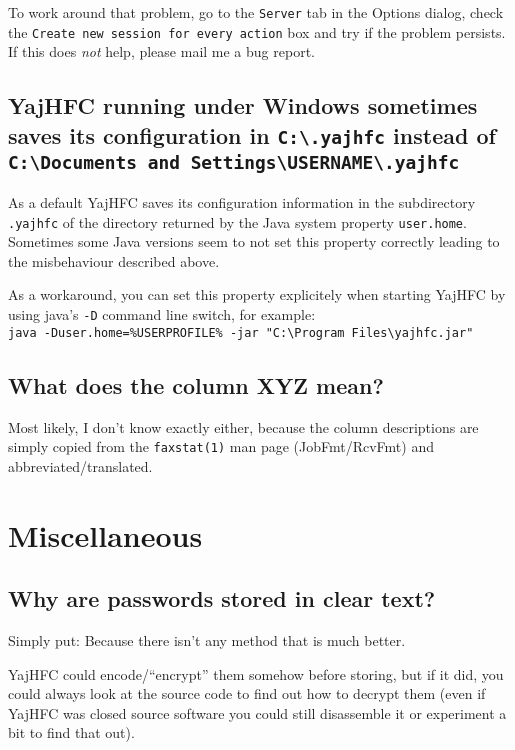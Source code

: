 \documentclass[a4paper,10pt]{scrartcl}
\begin{document}
To work around that problem, go to the \texttt{Server} tab in the Options dialog, check the \texttt{Create new session for every action} box and try if the problem persists.
If this does \emph{not} help, please mail me a bug report.

\subsection{YajHFC running under Windows sometimes saves its configuration in \texttt{C:\textbackslash .yajhfc} instead of \texttt{C:\textbackslash Documents and Settings\textbackslash USERNAME\textbackslash .yajhfc}}

As a default YajHFC saves its configuration information in the subdirectory \texttt{.yajhfc} of the directory returned by
the Java system property \texttt{user.home}.
Sometimes some Java versions seem to not set this property correctly leading to the misbehaviour described above.

As a workaround, you can set this property explicitely when starting YajHFC by using java's \texttt{-D} command line switch, for example: \\
\texttt{java -Duser.home=\%USERPROFILE\% -jar "C:\textbackslash Program Files\textbackslash yajhfc.jar"}

\subsection{What does the column XYZ mean?}

Most likely, I don't know exactly either, because the column descriptions
are simply copied from the \verb.faxstat(1). man page (JobFmt/RcvFmt) and 
abbreviated/translated.

\section{Miscellaneous}

\subsection{Why are passwords stored in clear text?}

Simply put: Because there isn't any method that is much better.

YajHFC could encode/``encrypt'' them somehow before storing, but if it did, 
you could always look at the source code to find out how to decrypt them
(even if YajHFC was closed source software you could still disassemble it
or experiment a bit to find that out).
\end{document}
